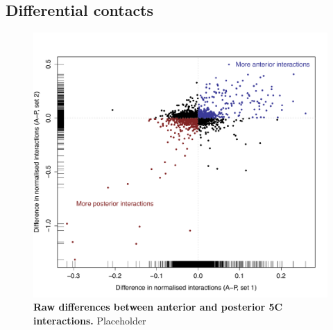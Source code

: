 \documentclass[a4paper,11pt,oneside]{book}
\begin{document}



\subsection{Differential contacts}


\begin{figure}
\begin{center} 
\includegraphics[width=\textwidth]{figs/5cfc.pdf}
\captionsetup{width=\textwidth} 
\caption[Raw differences between anterior and posterior 5C interactions.]{ {\bf Raw differences between anterior and posterior 5C interactions. }
Placeholder
}\label{fig:5cfc}
\end{center} 
\end{figure} 

\end{document}

